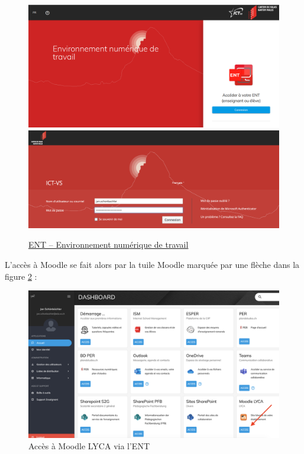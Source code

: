 \documentclass[10pt,a4paper]{report}
\begin{document}
	\begin{figure}[H]
		\centering
		\includegraphics[width=0.8\linewidth]{images/capture_ENT_20210811}\\ [2ex]
		\includegraphics[width=0.8\linewidth]{images/capture_ENT_login_20210828}
		\caption{\protect \href{https://edu.vs.ch}{ENT -- Environnement numérique de travail}}
		\label{fig:accesENT}
	\end{figure}
	
	
	L'accès à Moodle se fait alors par la tuile Moodle marquée par une flèche dans la figure \ref{fig:accesENTversMoodle} :
	
	\begin{figure}[H]
		\centering
		\includegraphics[width=0.8\linewidth]{images/capture_ENT_20210828}
		\caption{Accès à Moodle LYCA via l'ENT}
		\label{fig:accesENTversMoodle}
	\end{figure}
	
\end{document}
